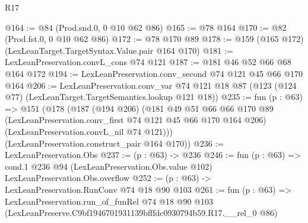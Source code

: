 \begin{lexlean}{R17}
\begin{coremodule}
@164 := @84 (Prod.snd.{0, 0} @10 @62 @86)
@165 := @78 @164
@170 := @82 (Prod.fst.{0, 0} @10 @62 @86)
@172 := @78 @170 @89
@178 := @159 (@165 @172) (LexLeanTarget.TargetSyntax.Value.pair @164 @170)
@181 := LexLeanPreservation.convL_cons @74 @121
@187 := @181 @46 @52 @66 @68 @164 @172
@194 := LexLeanPreservation.conv_second @74 @121 @45 @66 @170 @164
@206 := LexLeanPreservation.conv_var
    @74
    @121
    @18
    @87
    (@123 (@124 @77) (LexLeanTarget.TargetSemantics.lookup @121 @18))
@235 := fun (p : @63) =>
  @151
    (@178
      (@187
        (@194 @206)
        (@181
          @49
          @51
          @66
          @66
          @170
          @89
          (LexLeanPreservation.conv_first @74 @121 @45 @66 @170 @164 @206)
          (LexLeanPreservation.convL_nil @74 @121)))
      (LexLeanPreservation.construct_pair @164 @170))
@236 := LexLeanPreservation.Obs
@237 := (p : @63) -> @236
@246 := fun (p : @63) =>
  cond.{1} @236 @94 (LexLeanPreservation.Obs.value @102) LexLeanPreservation.Obs.overflow
@252 := (p : @63) -> LexLeanPreservation.RunConv @74 @18 @90 @103
@261 := fun (p : @63) =>
  LexLeanPreservation.run_of_funRel
    @74
    @18
    @90
    @103
    (LexLeanPreserve.C9bf1946701931139bfffdc0930794b59.R17.__rel_0 @86)
\end{coremodule}
\end{lexlean}

